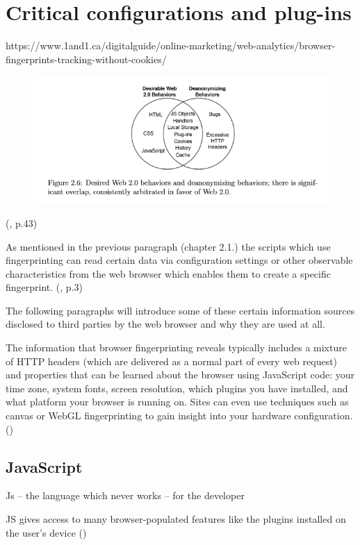 \section{Critical configurations and plug-ins}
https://www.1and1.ca/digitalguide/online-marketing/web-analytics/browser-fingerprints-tracking-without-cookies/

\begin{figure}
	\centering
	\includegraphics[width=0.7\linewidth]{images/dangerousConfigs}
	\caption{}
	\label{fig:dangerousconfigs}
\end{figure}
(\textcite{mayer09}, p.43)

As mentioned in the previous paragraph (chapter 2.1.) the scripts which use fingerprinting can read certain data via configuration settings or other observable characteristics from the web browser which enables them to create a specific fingerprint. (\textcite{doty18}, p.3)

The following paragraphs will introduce some of these certain information sources disclosed to third parties by the web browser and why they are used at all.


The information that browser fingerprinting reveals typically includes a mixture of HTTP headers (which are delivered as a normal part of every web request) and properties that can be learned about the browser using JavaScript code: your time zone, system fonts, screen resolution, which plugins you have installed, and what platform your browser is running on. Sites can even use techniques such as canvas or WebGL fingerprinting to gain insight into your hardware configuration.(\textcite{miele18})

\subsection{JavaScript}

Js – the language which never works – for the developer


JS gives access to many browser-populated features like the plugins installed on the user’s device (\textcite{amiunique})

